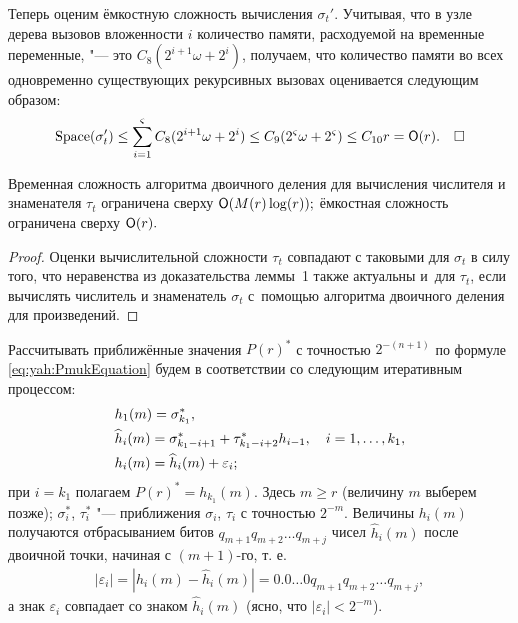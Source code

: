Теперь оценим ёмкостную сложность вычисления $\sigma_t'$.
Учитывая, что в узле дерева вызовов вложенности $i$ количество
памяти, расходуемой на временные переменные, "--- это
$C_8(2^{i+1}\omega+2^{i})$, получаем, что количество памяти
во всех одновременно существующих рекурсивных вызовах оценивается
следующим образом:
%
\begin{align*}
{\rm Space}(\sigma_t')
\le\sum_{i=1}^{\varsigma}{C_8(2^{i+1}\omega+2^{i})}
\le C_{9}(2^{\varsigma}\omega+2^{\varsigma})
\le C_{10}r={\sf O}(r).\quad \square
\end{align*}



\begin{lemma}[2]Временная сложность алгоритма двоичного деления для вычисления
числителя и знаменателя $\tau_t$ ограничена сверху ${\sf O}(M(r)\log(r));$
ёмкостная сложность ограничена сверху ${\sf O}(r).$
\end{lemma}

\smallskip
\begin{proof}
Оценки вычислительной сложности $\tau_t$ совпадают с таковыми
для $\sigma_t$ в силу того, что неравенства из доказательства
леммы~1 также актуальны и~для $\tau_t$, если вычислять числитель и
знаменатель $\sigma_t$ с~помощью алгоритма двоичного деления для
произведений.
\end{proof}

\smallskip

Рассчитывать приближённые значения $P(r)^*$ с точностью
$2^{-(n+1)}$ по формуле \eqref{eq:yah:PmukEquation}
будем в соответствии со следующим итеративным процессом:
%
\begin{align}
&h_1(m)=\sigma_{k_1}^*,\notag\\
&\widehat h_i(m)=\sigma_{k_1-i+1}^*+\tau_{k_1-i+2}^* h_{i-1},
\quad i=1,\dots,k_1,
\label{eq:yah:hiScheme}
\\
&h_i(m)=\widehat h_i(m)+\varepsilon_i;\notag
\end{align}
%
при $i=k_1$ полагаем $P(r)^*=h_{k_1}(m)$.
Здесь $m\ge r$ (величину $m$ выберем позже); $\sigma_i^*$, $\tau_i^*$ "---
приближения $\sigma_i$, $\tau_i$ с точностью $2^{-m}$.
%
Величины $h_i(m)$ получаются отбрасыванием битов
$q_{m+1}q_{m+2}\dots q_{m+j}$ чисел $\widehat h_i(m)$ после
двоичной точки, начиная с $(m+1)$-го, т. е.
%
\begin{align}
|\varepsilon_i|=|h_i(m)-\widehat h_i(m)|=
0.0\dots 0 q_{m+1}q_{m+2}\dots q_{m+j},
\label{eq:yah:varepsilonEquation}
\end{align}
%
а знак $\varepsilon_i$ совпадает со знаком $\widehat h_i(m)$ (ясно,
что $|\varepsilon_i|<2^{-m}$).

